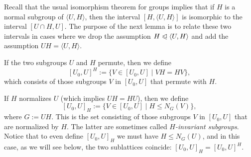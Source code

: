 \documentclass[cm,dissertation]{uhthesis}
\theoremstyle{plain}
\theoremstyle{definition}
\theoremstyle{remark}
\numberwithin{theorem}{section}
\numberwithin{claim}{chapter}
\numberwithin{equation}{section}
\numberwithin{conjecture}{chapter}
\newcommand{\<}{\ensuremath{\langle}}
\renewcommand{\>}{\ensuremath{\rangle}}
\renewcommand{\leq}{\ensuremath{\leqslant}}
\newcommand{\subnormal}{\ensuremath{\trianglelefteqslant}}
\newcommand{\0}{\ensuremath{\mathbf{0}}}
\newcommand{\1}{\ensuremath{\mathbf{1}}}
\newcommand{\2}{\ensuremath{\mathbf{2}}}
\newcommand{\3}{\ensuremath{\mathbf{3}}}
\newcommand{\4}{\ensuremath{\mathbf{4}}}
\newcommand{\5}{\ensuremath{\mathbf{5}}}
\begin{document}
\begin{center}
\end{center}
Recall that the usual isomorphism theorem for groups implies
that 
if $H$ is a normal subgroup of $\<U, H\>$, 
then the interval
$[H, \<U, H\>]$ is isomorphic to the interval $[U\cap H, U]$.  The 
purpose of the next lemma is to relate these two
intervals in cases where we drop the assumption $H\subnormal \<U,H\>$
and add the assumption $UH = \<U,H\>$.

If the two subgroups $U$ and $H$ permute, then we define 
\begin{equation}
  \label{eq:dedekind-1}
[U_0, U]^H := \{ V\in [U_0,U] \mid VH = HV\},
\end{equation}
which consists of those subgroups $V$ in $[U_0, U]$ that permute with
$H$. 

If $H$ normalizes $U$ (which implies $UH=HU$), 
then we %
define
\begin{equation}
  \label{eq:dedekind-2}
[U_0, U]_H := \{ V\in [U_0,U] \mid H\leq N_G(V)\},
\end{equation}
where $G:=UH$.  This is the set consisting of those subgroups $V$ in $[U_0, U]$ that
are normalized by $H$.  The latter are sometimes called 
\emph{$H$-invariant subgroups}.
Notice that to even
define $[U_0, U]_H$ we must have $H\leq N_G(U)$, and in this case, as we will
see below, the two sublattices coincide: 
$[U_0, U]_H  =  [U_0, U]^H$.  
\end{document}

